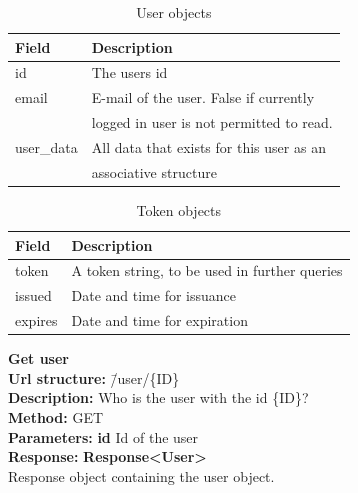 \documentclass[11pt]{article}
\begin{document}
\begin{table}[H]
\caption{User objects}
\begin{center}
\begin{tabular}{|l|l|}
\hline
 Field                   &  Description                               \\
\hline
 id                      &  The users id                              \\
 \hline
 email                   &  E-mail of the user. False if currently    \\
                         &  logged in user is not permitted to read.  \\
\hline                         
 user\_data  &  All data that exists for this user as an  \\
                         &  associative structure                     \\
\hline
\end{tabular}
\end{center}
\end{table}

\begin{table}[H]
\caption{Token objects}
\begin{center}
\begin{tabular}{|l|l|}
\hline
 Field    &  Description                                    \\
\hline
 token    &  A token string, to be used in further queries  \\
 issued   &  Date and time for issuance                     \\
 expires  &  Date and time for expiration                   \\
\hline
\end{tabular}
\end{center}
\end{table}
 
\begin{tabbing}
\textbf{Get user} \\
\textcolor{black!60}{\textbf{Url structure:}} \hspace{0.2in} \= /user/\{ID\} \\
\textcolor{black!60}{\textbf{Description:}}  \> Who is the user with the id \{ID\}? \\
\textcolor{black!60}{\textbf{Method:}} \> GET \\
\textcolor{black!60}{\textbf{Parameters:}}  \> \textbf{id} Id of the user \\
\textcolor{black!60}{\textbf{Response:}} \> \textbf{Response<User>} \\
\> Response object containing the user object. \\
\end{tabbing}
\end{document}
